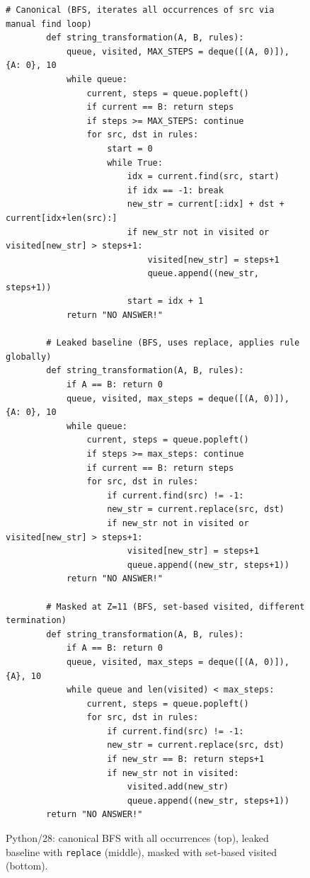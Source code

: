 \documentclass[mscthesis]{usiinfthesis}
\begin{document}
\begin{figure}[H]
    \begin{lstlisting}[style=pythonstyle2]
        # Canonical (BFS, iterates all occurrences of src via manual find loop)
        def string_transformation(A, B, rules):
            queue, visited, MAX_STEPS = deque([(A, 0)]), {A: 0}, 10
            while queue:
                current, steps = queue.popleft()
                if current == B: return steps
                if steps >= MAX_STEPS: continue
                for src, dst in rules:
                    start = 0
                    while True:
                        idx = current.find(src, start)
                        if idx == -1: break
                        new_str = current[:idx] + dst + current[idx+len(src):]
                        if new_str not in visited or visited[new_str] > steps+1:
                            visited[new_str] = steps+1
                            queue.append((new_str, steps+1))
                        start = idx + 1
            return "NO ANSWER!"
        
        # Leaked baseline (BFS, uses replace, applies rule globally)
        def string_transformation(A, B, rules):
            if A == B: return 0
            queue, visited, max_steps = deque([(A, 0)]), {A: 0}, 10
            while queue:
                current, steps = queue.popleft()
                if steps >= max_steps: continue
                if current == B: return steps
                for src, dst in rules:
                    if current.find(src) != -1:
                    new_str = current.replace(src, dst)
                    if new_str not in visited or visited[new_str] > steps+1:
                        visited[new_str] = steps+1
                        queue.append((new_str, steps+1))
            return "NO ANSWER!"
        
        # Masked at Z=11 (BFS, set-based visited, different termination)
        def string_transformation(A, B, rules):
            if A == B: return 0
            queue, visited, max_steps = deque([(A, 0)]), {A}, 10
            while queue and len(visited) < max_steps:
                current, steps = queue.popleft()
                for src, dst in rules:
                    if current.find(src) != -1:
                    new_str = current.replace(src, dst)
                    if new_str == B: return steps+1
                    if new_str not in visited:
                        visited.add(new_str)
                        queue.append((new_str, steps+1))
        return "NO ANSWER!"
    \end{lstlisting}
    \caption{Python/28: canonical BFS with all occurrences (top), leaked baseline with \texttt{replace} (middle), masked with set-based visited (bottom).}
    \label{fig:python28}
\end{figure}
\end{document}
